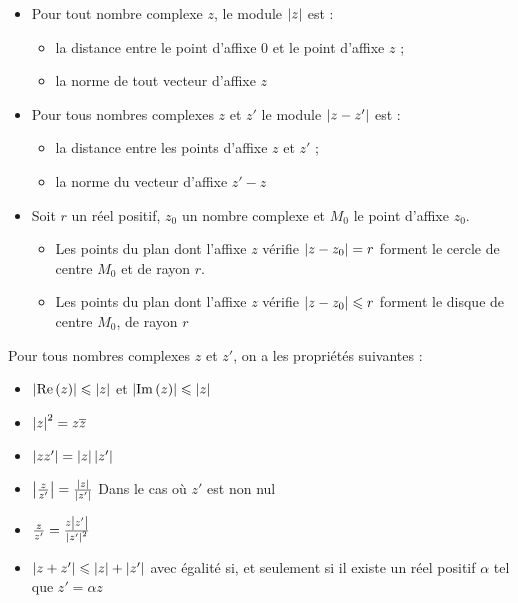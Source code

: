 \begin{defprop}
	\begin{itemize}
		\item Pour tout nombre complexe \(z\), le module \(\left\lvert z\right\rvert\) est : \begin{itemize}
			      \item la distance entre le point d’affixe \(0\) et le point d’affixe \(z\) ;
			      \item la norme de tout vecteur d’affixe \(z\)
		      \end{itemize}
		\item Pour tous nombres complexes  \(z\) et \(z'\) le module \(\left\lvert z-z'\right\rvert\) est :\begin{itemize}
			      \item la distance entre les points d’affixe \(z\) et \(z'\) ;
			      \item la norme du vecteur d’affixe \(z' - z\)
		      \end{itemize}
		\item Soit \(r\) un réel positif, \(z_0\) un nombre complexe et \(M_0\) le point d’affixe \(z_0\).
		      \begin{itemize}
			      \item Les points du plan dont l’affixe \(z\) vérifie \(\left\lvert z - z_0\right\rvert = r\) forment le cercle de centre \(M_0\) et de rayon \(r\).
			      \item Les points du plan dont l’affixe \(z\) vérifie \(\left\lvert z - z_0\right\rvert \leqslant r\) forment le disque de centre \(M_0\), de rayon \(r\)
		      \end{itemize}
	\end{itemize}
\end{defprop}

\begin{prop}
	Pour tous nombres complexes \(z\) et \(z'\), on a les propriétés suivantes :
	\begin{itemize}
		\item \(\left\lvert\operatorname{Re}\left(z\right)\right\rvert \leqslant \left\lvert z\right\rvert\) et \(\left\lvert\operatorname{Im}\left(z\right)\right\rvert \leqslant \left\lvert z\right\rvert\)
		\item \(\left\lvert z\right\rvert^2 = z \overline{z}\)
		\item \(\left\lvert zz'\right\rvert = \left\lvert z\right\rvert \left\lvert z'\right\rvert\)
		\item \(\left\lvert\frac{z}{z'}\right\rvert = \frac{\left\lvert z\right\rvert}{\left\lvert z'\right\rvert}\) Dans le cas où \(z'\) est non nul
		\item \(\frac{z}{z'} = \frac{z\left\lvert z'\right\rvert}{\left\lvert z'\right\rvert^2}\)
		\item \(\left\lvert z+z'\right\rvert \leqslant \left\lvert z\right\rvert+\left\lvert z'\right\rvert\) avec égalité si, et seulement si il existe un réel positif \(\alpha\) tel que \(z' = \alpha z\)
	\end{itemize}
\end{prop}

